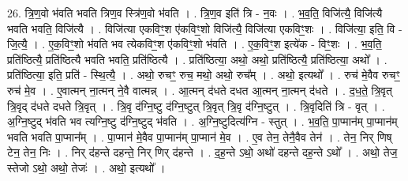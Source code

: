 \documentclass[17pt]{extarticle}
\begin{document}
26. त्रि॒ण॒वो भ॑वति भवति त्रिण॒व स्त्रि॑ण॒वो भ॑वति । . त्रि॒ण॒व इति॑ त्रि - न॒वः । . भ॒व॒ति॒ विजि॑त्यै॒ विजि॑त्यै भवति भवति॒ विजि॑त्यै । . विजि॑त्या एकविꣳ॒॒श ए॑कविꣳ॒॒शो विजि॑त्यै॒ विजि॑त्या एकविꣳ॒॒शः । . विजि॑त्या॒ इति॒ वि - जि॒त्यै॒ । . ए॒क॒विꣳ॒॒शो भ॑वति भव त्येकविꣳ॒॒श ए॑कविꣳ॒॒शो भ॑वति । . ए॒क॒विꣳ॒॒श इत्ये॑क - विꣳ॒॒शः । . भ॒व॒ति॒ प्रति॑ष्ठित्यै॒ प्रति॑ष्ठित्यै भवति भवति॒ प्रति॑ष्ठित्यै । . प्रति॑ष्ठित्या॒ अथो॒ अथो॒ प्रति॑ष्ठित्यै॒ प्रति॑ष्ठित्या॒ अथो᳚ । . प्रति॑ष्ठित्या॒ इति॒ प्रति॑ - स्थि॒त्यै॒ । . अथो॒ रुचꣳ॒॒ रुच॒ मथो॒ अथो॒ रुच᳚म् । . अथो॒ इत्यथो᳚ । . रुच॑ मे॒वैव रुचꣳ॒॒ रुच॑ मे॒व । . ए॒वात्मन् ना॒त्मन् ने॒वै वात्मन्न् । . आ॒त्मन् द॑धते दधत आ॒त्मन् ना॒त्मन् द॑धते । . द॒ध॒ते॒ त्रि॒वृत् त्रि॒वृद् द॑धते दधते त्रि॒वृत् । . त्रि॒वृ द॑ग्नि॒ष्टु द॑ग्नि॒ष्टुत् त्रि॒वृत् त्रि॒वृ द॑ग्नि॒ष्टुत् । . त्रि॒वृदिति॑ त्रि - वृत् । . अ॒ग्नि॒ष्टुद् भ॑वति भव त्यग्नि॒ष्टु द॑ग्नि॒ष्टुद् भ॑वति । . अ॒ग्नि॒ष्टुदित्य॑ग्नि - स्तुत् । . भ॒व॒ति॒ पा॒प्मान॑म् पा॒प्मान॑म् भवति भवति पा॒प्मान᳚म् । . पा॒प्मान॑ मे॒वैव पा॒प्मान॑म् पा॒प्मान॑ मे॒व । . ए॒व तेन॒ तेनै॒वैव तेन॑ । . तेन॒ निर् णिष् टेन॒ तेन॒ निः । . निर् द॑हन्ते दहन्ते॒ निर् णिर् द॑हन्ते । . द॒ह॒न्ते ऽथो॒ अथो॑ दहन्ते दह॒न्ते ऽथो᳚ । . अथो॒ तेज॒ स्तेजो ऽथो॒ अथो॒ तेजः॑ । . अथो॒ इत्यथो᳚ । \newline
\end{document}
